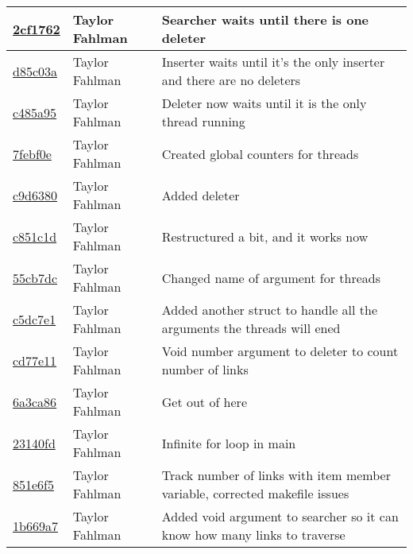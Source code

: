\begin{tabular}{l l l}
\href{https://github.com/fahlmant/cs444/commit/2cf17628d8ca7888520cf9403f2577f57806bd71}{2cf1762} & Taylor Fahlman & Searcher waits until there is one deleter\\\hline
\href{https://github.com/fahlmant/cs444/commit/d85c03a6b857f72891efa170e38dc11395d77ae4}{d85c03a} & Taylor Fahlman & Inserter waits until it's the only inserter and there are no deleters\\\hline
\href{https://github.com/fahlmant/cs444/commit/c485a95c353e793a843ad6bdac4eea06562e642a}{c485a95} & Taylor Fahlman & Deleter now waits until it is the only thread running\\\hline
\href{https://github.com/fahlmant/cs444/commit/7febf0eb7674a18771178778a1b1b246e9722602}{7febf0e} & Taylor Fahlman & Created global counters for threads\\\hline
\href{https://github.com/fahlmant/cs444/commit/c9d63807d789e377e196ce1a94e3320a7514a901}{c9d6380} & Taylor Fahlman & Added deleter\\\hline
\href{https://github.com/fahlmant/cs444/commit/c851c1dc8be7c97ca7bbbe94fa9d80150763d259}{c851c1d} & Taylor Fahlman & Restructured a bit, and it works now\\\hline
\href{https://github.com/fahlmant/cs444/commit/55cb7dc0b437c2cc03c1a7683558cd48dd96c634}{55cb7dc} & Taylor Fahlman & Changed name of argument for threads\\\hline
\href{https://github.com/fahlmant/cs444/commit/c5dc7e1f2b65460a3e119935f06968ed0f8b2691}{c5dc7e1} & Taylor Fahlman & Added another struct to handle all the arguments the threads will ened\\\hline
\href{https://github.com/fahlmant/cs444/commit/cd77e11202390d5f7cdad25b2e5ecfa5d42f7dcd}{cd77e11} & Taylor Fahlman & Void number argument to deleter to count number of links\\\hline
\href{https://github.com/fahlmant/cs444/commit/6a3ca86d0ff1a6e3894d9f03838f423564d0a755}{6a3ca86} & Taylor Fahlman & Get out of here\\\hline
\href{https://github.com/fahlmant/cs444/commit/23140fd4536d1b8552c0db457dcfa4e2b8161635}{23140fd} & Taylor Fahlman & Infinite for loop in main\\\hline
\href{https://github.com/fahlmant/cs444/commit/851e6f51a0b171ec4deac5923320cae97a549be6}{851e6f5} & Taylor Fahlman & Track number of links with item member variable, corrected makefile issues\\\hline
\href{https://github.com/fahlmant/cs444/commit/1b669a7f2ee9d13ba60e92be4d83db9569866bfc}{1b669a7} & Taylor Fahlman & Added void argument to searcher so it can know how many links to traverse\\\hline

\end{tabular}
